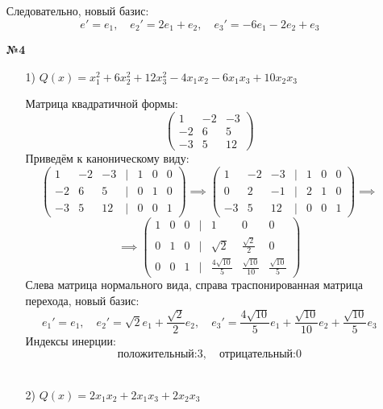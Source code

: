\documentclass[a4paper]{article}
\begin{document}
\begin{enumerate}
    Следовательно, новый базис:
    $$e' = e_1, \quad e_2' = 2e_1+e_2, \quad e_3' = -6e_1-2e_2+e_3$$

    \item[\textbf{№4}]\begin{enumerate}
        \item[1)]$Q(x) = x_1^2+6x_2^2+12x_3^2-4x_1x_2-6x_1x_3+10x_2x_3$
        
        Матрица квадратичной формы:
        $$\begin{pmatrix}
            1 & -2 & -3 \\
            -2 & 6 & 5 \\
            -3 & 5 & 12
            \end{pmatrix}$$
        Приведём к каноническому виду:
        $$\begin{pmatrix}
            1 & -2 & -3 & | & 1 &0 & 0\\
            -2 & 6 & 5 &| & 0 & 1& 0\\
            -3 & 5 & 12 & | & 0 & 0 & 1
            \end{pmatrix} \implies \begin{pmatrix}
                1 & -2 & -3 & | & 1 &0 & 0\\
                0 & 2 & -1 &| & 2 & 1& 0\\
                -3 & 5 & 12 & | & 0 & 0 & 1
                \end{pmatrix} \implies$$
        $$\implies \begin{pmatrix}
            1 & 0 & 0  & |& 1 & 0 & 0 \\
            0 & 1 & 0  & |& \sqrt{2} & \frac{\sqrt{2}}{2} & 0 \\
            0 & 0 & 1  & |& \frac{4\sqrt{10}}{5} & \frac{\sqrt{10}}{10} & 
            \frac{\sqrt{10}}{5}
            \end{pmatrix}$$
        Слева матрица нормального вида, справа траспонированная матрица перехода, новый базис:
        $$e_1' = e_1, \quad
         e_2' = \sqrt{2}e_1+\frac{\sqrt{2}}{2}e_2, \quad
        e_3' =  \frac{4\sqrt{10}}{5}e_1+ \frac{\sqrt{10}}{10}e_2
        +\frac{\sqrt{10}}{5}e_3$$
        Индексы инерции:
        $$\text{положительный:} 3, \quad \text{отрицательный:} 0$$\\

        \item[2)]
        $ Q(x) = 2x_1x_2 + 2x_1x_3 + 2x_2x_3 $
        

\end{enumerate}
\end{enumerate}
\end{document}
